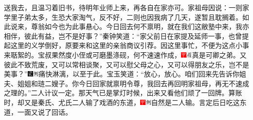 送我去，且温习着旧书，待明年业师上来，再各自在家亦可。家祖母因说：一则家学里子弟太多，生恐大家淘气，反不好，二则也因我病了几天，遂暂且耽搁着。如此说来，尊翁如今也为此事悬心。今日回去何不禀明，就在我们这敝塾中来，我亦相伴，彼此有益，岂不是好事？”秦钟笑道：“家父前日在家提及延师一事，也曾提起这里的义学倒好，原要来和这里的亲翁商议引荐。因这里事忙，不便为这点小事来聒絮的。宝叔果然度小侄或可磨墨涤砚，何不速速作成，{\includegraphics[width=3mm]{../Images/00002}\includegraphics[width=3mm]{../Images/00010}\footnotesize \kaishu 真是可卿之弟。}又彼此不致荒废，又可以常相谈聚，又可以慰父母之心，又可以得朋友之乐，岂不是美事？”{\includegraphics[width=3mm]{../Images/00006}\includegraphics[width=3mm]{../Images/00011}\footnotesize \kaishu 痛快淋漓，以至于此。}宝玉笑道：“放心，放心。咱们回来先告诉你姐夫、姐姐和琏二嫂子。你今日回家就禀明令尊，我回去再回明家祖母，再无不速成之理的。”二人计议一定。那天气已是掌灯时候，出来又看他们顽了一回牌。算账时，却又是秦氏、尤氏二人输了戏酒的东道，{\includegraphics[width=3mm]{../Images/00002}\includegraphics[width=3mm]{../Images/00011}\footnotesize \kaishu 自然是二人输。}言定后日吃这东道，一面又说了回话。

